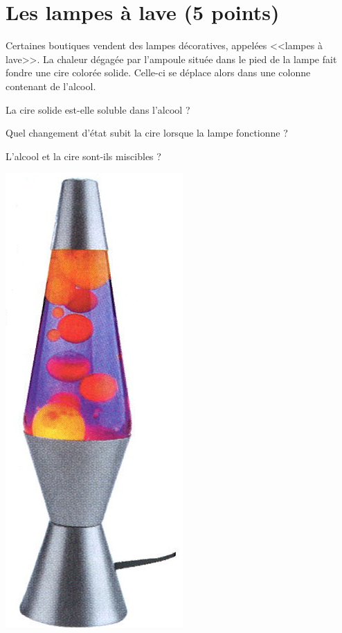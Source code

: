 \section{Les lampes à lave (5 points)}

Certaines boutiques vendent des lampes décoratives, appelées <<lampes à lave>>. La chaleur dégagée par l'ampoule située dans le pied de la lampe fait fondre une cire colorée solide. Celle-ci se déplace alors dans une colonne contenant de l'alcool.

\begin{multicols}{2}
	\begin{questions}
		\question[1\half] La cire solide est-elle soluble dans l'alcool ?
		
		\question[1\half] Quel changement d'état subit la cire lorsque la lampe fonctionne ?
		
		\question[2] L'alcool et la cire sont-ils miscibles ?
	\end{questions}

	\begin{center}
		\includegraphics[scale=0.8]{img/lampe}
	\end{center}
\end{multicols}
